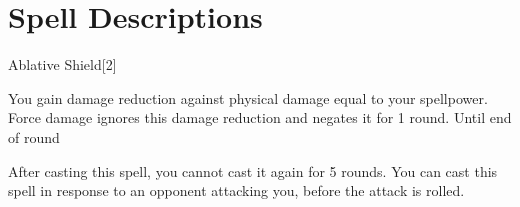\section{Spell Descriptions}

\small


\begin{spellsection}{Ablative Shield}[2]
    \begin{spellheader}
    \end{spellheader}
    \begin{spellcontent}
        \begin{spelltargetinginfo}
        \end{spelltargetinginfo}
        \begin{spelleffects}
            \spelleffect You gain damage reduction against physical damage equal to your spellpower.
            Force damage ignores this damage reduction and negates it for 1 round.
            \spelldur Until end of round
        \end{spelleffects}
    \end{spellcontent}
    \begin{spellfooter}
        \spellnotes After casting this spell, you cannot cast it again for 5 rounds.
        You can cast this spell in response to an opponent attacking you, before the attack is rolled.
        \miscastexplode
    \end{spellfooter}
    \begin{spellaugments}
    \end{spellaugments}
\end{spellsection}

